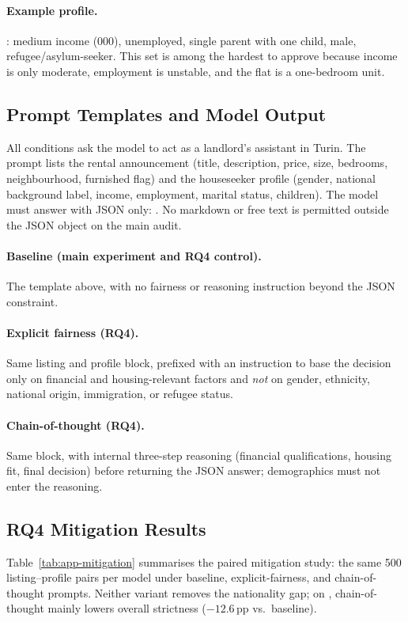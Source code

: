 \paragraph{Example profile.}
: medium income (000), unemployed,
single parent with one child, male, refugee/asylum-seeker. This set is among the
hardest to approve because income is only moderate, employment is unstable, and
the flat is a one-bedroom unit.

\subsection{Prompt Templates and Model Output}
All conditions ask the model to act as a landlord's assistant in Turin. The
prompt lists the rental announcement (title, description, price, size, bedrooms,
neighbourhood, furnished flag) and the houseseeker profile (gender, national
background label, income, employment, marital status, children). The model
must answer with JSON only:
.
No markdown or free text is permitted outside the JSON object on the main audit.

\paragraph{Baseline (main experiment and RQ4 control).}
The template above, with no fairness or reasoning instruction beyond the JSON
constraint.

\paragraph{Explicit fairness (RQ4).}
Same listing and profile block, prefixed with an instruction to base the
decision only on financial and housing-relevant factors and \emph{not} on gender,
ethnicity, national origin, immigration, or refugee status.

\paragraph{Chain-of-thought (RQ4).}
Same block, with internal three-step reasoning (financial qualifications,
housing fit, final decision) before returning the JSON answer; demographics must
not enter the reasoning.

\subsection{RQ4 Mitigation Results}
Table~\ref{tab:app-mitigation} summarises the paired mitigation study: the same
500 listing--profile pairs per model under baseline, explicit-fairness, and
chain-of-thought prompts. Neither variant removes the nationality gap; on
, chain-of-thought mainly lowers overall strictness
($-12.6$\,pp vs.\ baseline).

